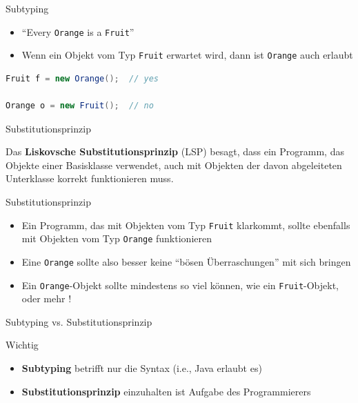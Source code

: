 \documentclass[18pt]{beamer}
\newcommand{\quotes}[1]{``#1''}
\begin{document}
\begin{frame}[fragile]{Subtyping}
    \begin{itemize}
        \item \quotes{Every \texttt{Orange} is a \texttt{Fruit}}
        \item Wenn ein Objekt vom Typ \texttt{Fruit} erwartet wird, dann ist \texttt{Orange} auch erlaubt
    \end{itemize}

    \begin{exampleblock}{}
        \begin{lstlisting}[language=Java]
Fruit f = new Orange();  // yes

Orange o = new Fruit();  // no
        \end{lstlisting}

    \end{exampleblock}
\end{frame}


\begin{frame}{Substitutionsprinzip}
    \begin{block}{}
        Das \textbf{Liskovsche Substitutionsprinzip} (LSP) besagt,
        dass ein Programm, das Objekte einer Basisklasse verwendet,
        auch mit Objekten der davon abgeleiteten Unterklasse korrekt funktionieren muss.
    \end{block}

\end{frame}

\begin{frame}{Substitutionsprinzip}
    \begin{itemize}
        \item Ein Programm, das mit Objekten vom Typ \texttt{Fruit} klarkommt, sollte ebenfalls mit Objekten vom Typ \texttt{Orange} funktionieren
        \item Eine \texttt{Orange} sollte also besser keine \quotes{bösen Überraschungen} mit sich bringen
        \item Ein \texttt{Orange}-Objekt sollte mindestens so viel können, wie ein \texttt{Fruit}-Objekt, oder mehr !
    \end{itemize}
\end{frame}

\begin{frame}{Subtyping vs. Substitutionsprinzip}
    \begin{alertblock}{Wichtig}
        \begin{itemize}
            \item \textbf{Subtyping} betrifft nur die Syntax (i.e., Java erlaubt es)
            \item \textbf{Substitutionsprinzip} einzuhalten ist Aufgabe des Programmierers
        \end{itemize}
    \end{alertblock}

\end{frame}
\end{document}
